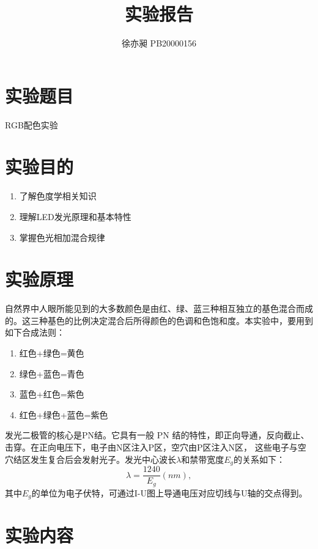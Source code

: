 \documentclass[UTF8]{ctexart}
\begin{document}
\title{实验报告}  
\author{徐亦昶 PB20000156}
\maketitle
\section{实验题目}RGB配色实验
\section{实验目的}
\begin{enumerate}
    \item 了解色度学相关知识
    \item 理解LED发光原理和基本特性
    \item 掌握色光相加混合规律
\end{enumerate}
\section{实验原理}
自然界中人眼所能见到的大多数颜色是由红、绿、蓝三种相互独立的基色混合而成的。这三种基色的比例决定混合后所得颜色的色调和色饱和度。本实验中，要用到如下合成法则：
\begin{enumerate}
    \item 红色+绿色=黄色
    \item 绿色+蓝色=青色
    \item 蓝色+红色=紫色
    \item 红色+绿色+蓝色=紫色
\end{enumerate} 
发光二极管的核心是PN结。它具有一般 PN 结的特性，即正向导通，反向截止、击穿。在正向电压下，电子由N区注入P区，空穴由P区注入N区，
这些电子与空穴结区发生复合后会发射光子。发光中心波长$\lambda$和禁带宽度$E_g$的关系如下：
\[\lambda=\frac{1240}{E_g}\left( nm \right),\]
其中$E_g$的单位为电子伏特，可通过I-U图上导通电压对应切线与U轴的交点得到。
\section{实验内容}
\end{document}
